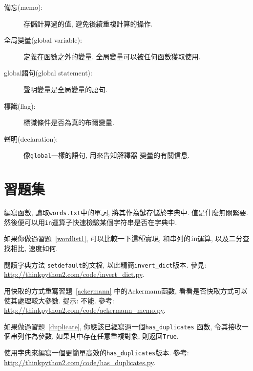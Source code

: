 \documentclass[10pt]{book}
\begin{document}
\begin{description}
\item[備忘(memo):] 存儲計算過的值, 避免後續重複計算的操作. 

\item[全局變量(global variable):] 定義在函數之外的變量. 
全局變量可以被任何函數獲取使用. 

\item[global語句(global statement):] 聲明變量是全局變量的語句.

\item[標識(flag):] 標識條件是否為真的布爾變量. 

\item[聲明(declaration):] 像{\tt global}一樣的語句, 用來告知解釋器
變量的有關信息. 

\end{description}


\section{習題集}

\begin{exercise}
\label{wordlist2}

編寫函數, 讀取{\tt words.txt}中的單詞, 
將其作為鍵存儲於字典中. 值是什麼無關緊要. 
然後便可以用{\tt in}運算子快速檢驗某個字符串是否在字典中. 

如果你做過習題~\ref{wordlist1}, 可以比較一下這種實現, 和串列的{\tt in}運算, 
以及二分查找相比, 速度如何. 

\end{exercise}


\begin{exercise}
\label{setdefault}
閱讀字典方法 {\tt setdefault}的文檔, 
以此精簡\verb"invert_dict"版本. 
參見: \url{http://thinkpython2.com/code/invert_dict.py}.

\end{exercise}


\begin{exercise}
用快取的方式重寫習題~\ref{ackermann} 中的Ackermann函數, 
看看是否快取方式可以使其處理較大參數. 
提示: 不能.
參考: \url{http://thinkpython2.com/code/ackermann_memo.py}.

\end{exercise}


\begin{exercise}
如果做過習題~\ref{duplicate}, 你應該已經寫過一個\verb"has_duplicates" 函數, 
令其接收一個串列作為參數, 如果其中存在任意重複對象, 則返回{\tt True}.

使用字典來編寫一個更簡單高效的\verb"has_duplicates"版本. 
參考: \url{http://thinkpython2.com/code/has_duplicates.py}.
\end{exercise}
\end{document}
